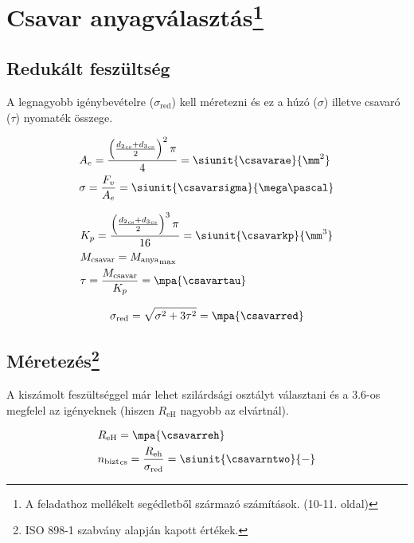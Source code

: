 \section[Csavar anyagválasztás]{Csavar anyagválasztás\protect\footnote{A feladathoz mellékelt segédletből származó számítások. (10-11. oldal)}}

\subsection{Redukált feszültség}

A legnagyobb igénybevételre ($\sigma_\text{red}$) kell méretezni és ez a húzó ($\sigma$) illetve csavaró ($\tau$) nyomaték összege.

\begin{align}
	&A_e = \frac{\left({\frac{{d_2}_\text{cs} + {d_3}_\text{cs}}{2}}\right)^2 \pi}{4} = \siunit{\csavarae}{\mm^2} \\
	&\sigma = \frac{F_v}{A_e} = \siunit{\csavarsigma}{\mega\pascal}
\end{align}

\begin{align}
	&K_p = \frac{\left(\frac{{d_2}_\text{cs} + {d_3}_\text{cs}}{2}\right)^3 \pi}{16} = \siunit{\csavarkp}{\mm^3} \\
	&M_\text{csavar} = {M_\text{anya}}_\text{max} \\
	&\tau = \frac{M_\text{csavar}}{K_p} = \mpa{\csavartau}
\end{align}

\begin{equation}
	\sigma_\text{red} = \sqrt{\sigma^2 + 3\tau^2} = \mpa{\csavarred}
\end{equation}

\subsection[Méretezés]{Méretezés\protect\footnote{ISO 898-1 szabvány alapján kapott értékek.}}

A kiszámolt feszültséggel már lehet szilárdsági osztályt választani és a 3.6-os megfelel az igényeknek (hiszen $R_\text{eH}$ nagyobb az elvártnál).

\begin{align}
	&R_\text{eH} = \mpa{\csavarreh} \\
	&{n_\text{bizt}}_\text{cs} = \frac{R_\text{eh}}{\sigma_\text{red}} = \siunit{\csavarntwo}{-}
\end{align}

